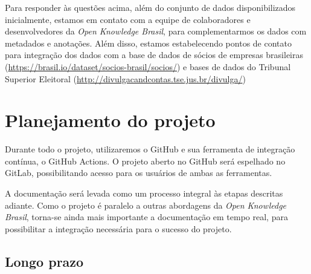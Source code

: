 \documentclass[10pt, a4paper]{article}
\begin{document}
Para responder às questões acima, além do conjunto de dados disponibilizados inicialmente, estamos em contato com a equipe de colaboradores e desenvolvedores da \textit{Open Knowledge Brasil}, para complementarmos os dados com metadados e anotações. Além disso, estamos estabelecendo pontos de contato para integração dos dados com a base de dados de sócios de empresas brasileiras (\url{https://brasil.io/dataset/socios-brasil/socios/}) e bases de dados do Tribunal Superior Eleitoral (\url{http://divulgacandcontas.tse.jus.br/divulga/})

\section{Planejamento do projeto}

Durante todo o projeto, utilizaremos o GitHub e sua ferramenta de integração contínua, o GitHub Actions. O projeto aberto no GitHub será espelhado no GitLab, possibilitando acesso para os usuários de ambas as ferramentas.


A documentação será levada como um processo integral às etapas descritas adiante. Como o projeto é paralelo a outras abordagens da \textit{Open Knowledge Brasil}, torna-se ainda mais importante a documentação em tempo real, para possibilitar a integração necessária para o sucesso do projeto.

\subsection{Longo prazo}
\end{document}
